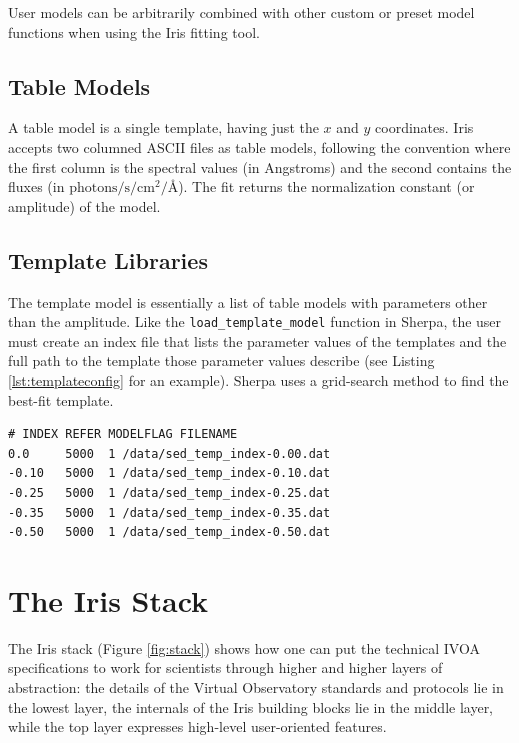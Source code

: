 \documentclass[preprint,authoryear,5p]{elsarticle}
\begin{document}
User models can be arbitrarily combined with other custom or preset model
functions when using the Iris fitting tool.

\subsection{Table Models} A table model is a single template, having just the
$x$ and $y$ coordinates. Iris accepts two columned ASCII files as table models,
following the convention where the first column is the spectral values (in
Angstroms) and the second contains the fluxes (in
$\mathrm{photons}/\mathrm{s}/\mathrm{cm}^{2}/\mbox{\AA}$). The fit returns the
normalization constant (or amplitude) of the model.

\begin{sloppypar}
\subsection{Template Libraries} The template model is essentially a list of
table models with parameters other than the amplitude. Like the
\texttt{load\_template\_model} function in Sherpa, the user must create an index
file that lists the parameter values of the templates and the full path to the
template those parameter values describe (see Listing \ref{lst:templateconfig}
for an example). Sherpa uses a grid-search method to find the best-fit template.
\end{sloppypar}

\begin{lstlisting}[style=code,
	caption={Example of template library definition file. Template library definition
	 files are in ASCII format.},
	label=lst:templateconfig]
# INDEX REFER MODELFLAG FILENAME
0.0     5000  1	/data/sed_temp_index-0.00.dat
-0.10   5000  1 /data/sed_temp_index-0.10.dat
-0.25   5000  1 /data/sed_temp_index-0.25.dat
-0.35   5000  1 /data/sed_temp_index-0.35.dat
-0.50   5000  1 /data/sed_temp_index-0.50.dat
\end{lstlisting}

\section{The Iris Stack} \label{sec:stack}

\begin{sloppypar}
The Iris stack (Figure \ref{fig:stack}) shows how one can put the 
technical IVOA specifications to work for scientists through higher and higher
layers of abstraction: the details of the Virtual Observatory
standards and protocols lie in the lowest layer, the internals of the Iris
building blocks lie in the middle layer, while the top layer expresses
high-level user-oriented features.
\end{sloppypar}
\end{document}
